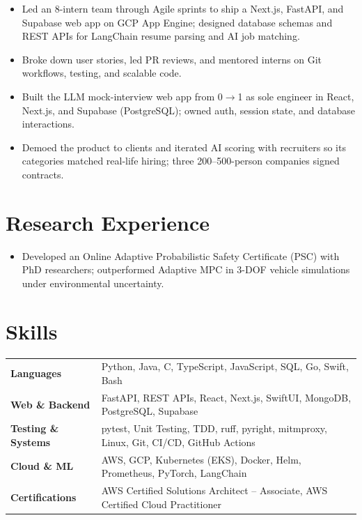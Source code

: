 \documentclass[11pt, letterpaper]{article}
\begin{document}
\vspace{1pt}
\begin{itemize}
  \item Led an 8-intern team through Agile sprints to ship a Next.js, FastAPI, and Supabase web app on GCP App Engine; designed database schemas and REST APIs for LangChain resume parsing and AI job matching.
  \item Broke down user stories, led PR reviews, and mentored interns on Git workflows, testing, and scalable code.
\end{itemize}

\vspace{1pt}
\begin{itemize}
  \item Built the LLM mock-interview web app from 0$\to$1 as sole engineer in React, Next.js, and Supabase (PostgreSQL); owned auth, session state, and database interactions.
  \item Demoed the product to clients and iterated AI scoring with recruiters so its categories matched real-life hiring; three 200--500-person companies signed contracts.
\end{itemize}

\section{Research Experience}
\begin{itemize}
  \item Developed an Online Adaptive Probabilistic Safety Certificate (PSC) with PhD researchers; outperformed Adaptive MPC in 3-DOF vehicle simulations under environmental uncertainty.
\end{itemize}

\section{Skills}
\begin{tabularx}{\textwidth}{@{}l @{\hspace{7pt}} >{\raggedright\arraybackslash}X@{}}
  \textbf{Languages} & Python, Java, C, TypeScript, JavaScript, SQL, Go, Swift, Bash \\[1pt]
  \textbf{Web \& Backend} & FastAPI, REST APIs, React, Next.js, SwiftUI, MongoDB, PostgreSQL, Supabase \\[1pt]
  \textbf{Testing \& Systems} & pytest, Unit Testing, TDD, ruff, pyright, mitmproxy, Linux, Git, CI/CD, GitHub Actions \\[1pt]
  \textbf{Cloud \& ML} & AWS, GCP, Kubernetes (EKS), Docker, Helm, Prometheus, PyTorch, LangChain \\[1pt]
  \textbf{Certifications} & AWS Certified Solutions Architect -- Associate, AWS Certified Cloud Practitioner \\
\end{tabularx}
\end{document}
